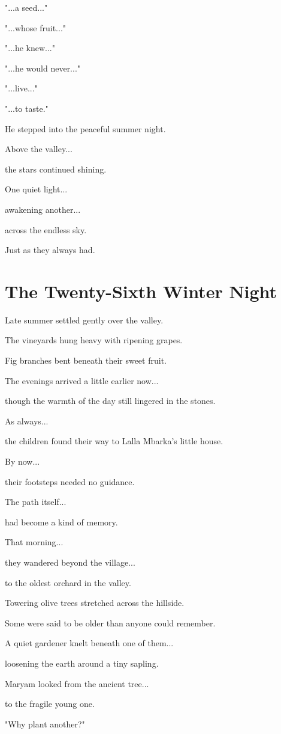 \documentclass[12pt,openany]{book}
\begin{document}
"...a seed..."

"...whose fruit..."

"...he knew..."

"...he would never..."

"...live..."

"...to taste."

He stepped into the peaceful summer night.

Above the valley...

the stars continued shining.

One quiet light...

awakening another...

across the endless sky.

Just as they always had.
\chapter{The Twenty-Sixth Winter Night}

Late summer settled gently over the valley.

The vineyards hung heavy with ripening grapes.

Fig branches bent beneath their sweet fruit.

The evenings arrived a little earlier now...

though the warmth of the day still lingered in the stones.

As always...

the children found their way to Lalla Mbarka's little house.

By now...

their footsteps needed no guidance.

The path itself...

had become a kind of memory.

That morning...

they wandered beyond the village...

to the oldest orchard in the valley.

Towering olive trees stretched across the hillside.

Some were said to be older than anyone could remember.

A quiet gardener knelt beneath one of them...

loosening the earth around a tiny sapling.

Maryam looked from the ancient tree...

to the fragile young one.

"Why plant another?"
\end{document}
